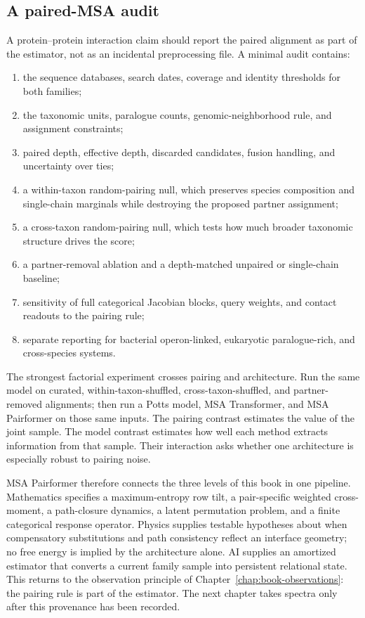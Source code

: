 \subsection{A paired-MSA audit}

A protein--protein interaction claim should report the paired alignment as part of the estimator,
not as an incidental preprocessing file.  A minimal audit contains:
\begin{enumerate}
\setlength{\itemsep}{2pt}
\item the sequence databases, search dates, coverage and identity thresholds for both families;
\item the taxonomic units, paralogue counts, genomic-neighborhood rule, and assignment constraints;
\item paired depth, effective depth, discarded candidates, fusion handling, and uncertainty over
ties;
\item a within-taxon random-pairing null, which preserves species composition and single-chain
marginals while destroying the proposed partner assignment;
\item a cross-taxon random-pairing null, which tests how much broader taxonomic structure drives the
score;
\item a partner-removal ablation and a depth-matched unpaired or single-chain baseline;
\item sensitivity of full categorical Jacobian blocks, query weights, and contact readouts to the
pairing rule;
\item separate reporting for bacterial operon-linked, eukaryotic paralogue-rich, and cross-species
systems.
\end{enumerate}

The strongest factorial experiment crosses pairing and architecture.  Run the same model on
curated, within-taxon-shuffled, cross-taxon-shuffled, and partner-removed alignments; then run a
Potts model, MSA Transformer, and MSA Pairformer on those same inputs.  The pairing contrast
estimates the value of the joint sample.  The model contrast estimates how well each method
extracts information from that sample.  Their interaction asks whether one architecture is
especially robust to pairing noise.

MSA Pairformer therefore connects the three levels of this book in one pipeline.  Mathematics
specifies a maximum-entropy row tilt, a pair-specific weighted cross-moment, a path-closure
dynamics, a latent permutation problem, and a finite categorical response operator.  Physics
supplies testable hypotheses about when compensatory substitutions and path consistency reflect an
interface geometry; no free energy is implied by the architecture alone.  AI supplies an amortized
estimator that converts a current family sample into persistent relational state.  This returns to
the observation principle of
Chapter~\ref{chap:book-observations}: the pairing rule is part of the estimator.  The next chapter
takes spectra only after this provenance has been recorded.
